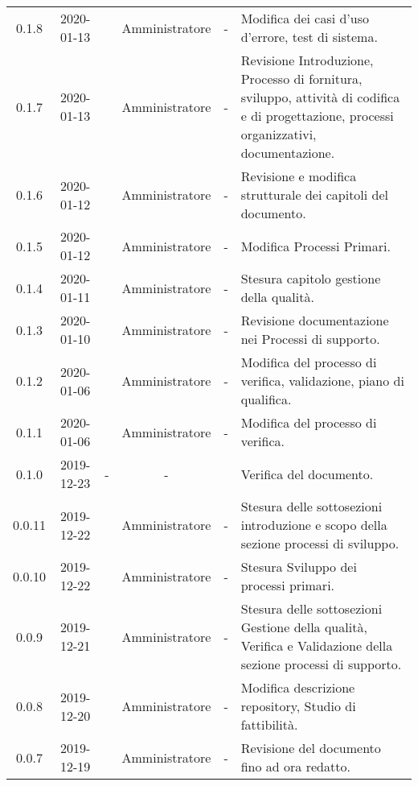 {\begin{longtable}{ c c  C{2.5cm} c C{3cm} C{3.5cm}}
0.1.8 & 2020-01-13 & \BR{} & Amministratore & - & Modifica dei casi d'uso d'errore, test di sistema. \\

0.1.7 & 2020-01-13 & \AT{} & Amministratore & - & Revisione Introduzione, Processo di fornitura, sviluppo, attività di codifica e di progettazione, processi organizzativi, documentazione. \\

0.1.6 & 2020-01-12 & \MC{} & Amministratore & - & Revisione e modifica strutturale dei capitoli del documento. \\

0.1.5 & 2020-01-12 & \AT{} & Amministratore & - & Modifica Processi Primari. \\

0.1.4 & 2020-01-11 & \MC{} & Amministratore & - & Stesura capitolo gestione della qualità. \\

0.1.3 & 2020-01-10 & \MC{} & Amministratore & - & Revisione documentazione nei Processi di supporto. \\

0.1.2 & 2020-01-06 & \AT{} & Amministratore & - & Modifica del processo di verifica, validazione, piano di qualifica. \\

0.1.1 & 2020-01-06 & \AT{} & Amministratore & - & Modifica del processo di verifica. \\

0.1.0 & 2019-12-23 & - & - & \CE{} & Verifica del documento. \\

0.0.11 & 2019-12-22 & \PF{} & Amministratore & - & Stesura delle sottosezioni introduzione e scopo della sezione processi di sviluppo. \\

0.0.10 & 2019-12-22 & \PF{} & Amministratore & - & Stesura Sviluppo dei processi primari. \\

0.0.9 & 2019-12-21 & \PF{} & Amministratore & - & Stesura delle sottosezioni Gestione della qualità, Verifica e Validazione della sezione processi di supporto. \\

0.0.8 & 2019-12-20 & \MC{} & Amministratore & - & Modifica descrizione repository, Studio di fattibilità. \\

0.0.7 & 2019-12-19 & \SE{} & Amministratore & - & Revisione del documento fino ad ora redatto. \\


\end{longtable}}
